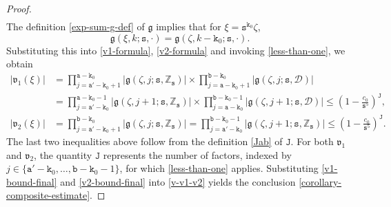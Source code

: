 \documentclass[12pt, twoside]{article}
\theoremstyle{definition}
\numberwithin{equation}{section}
\begin{document}
\begin{proof}
\begin{align}
\end{align} 
The definition \eqref{exp-sum-g-def} of $\mathfrak g$ implies that for $\xi = \mathtt s^{\mathtt k_0} \zeta$,
\begin{equation*}  \mathfrak g(\xi, k; \mathtt s, \cdot) = 
	\mathfrak g(\zeta, k - \mathtt k_0; \mathtt s, \cdot).
\end{equation*} 
Substituting this into \eqref{v1-formula}, \eqref{v2-formula} and invoking \eqref{less-than-one}, we obtain  
\begin{align} 
\bigl|\mathfrak v_1(\xi) \bigr| &= \prod_{j = \mathtt a' - \mathtt k_0 +1}^{\mathtt a - \mathtt k_0} \bigl|\mathfrak g(\zeta, j; \mathtt s, \mathbb Z_{\mathtt s}) \bigr| \times \prod_{j=\mathtt a - \mathtt k_0+1}^{\mathtt b - \mathtt k_0} \bigl|\mathfrak g(\zeta, j; \mathtt s, \mathscr{D})\bigr| \nonumber \\ 
&=  \prod_{j = \mathtt a' - \mathtt k_0}^{\mathtt a - \mathtt k_0-1} \bigl|\mathfrak g(\zeta, j+1; \mathtt s, \mathbb Z_{\mathtt s}) \bigr| \times \prod_{j=\mathtt a - \mathtt k_0}^{\mathtt b - \mathtt k_0-1} \bigl|\mathfrak g(\zeta, j+1; \mathtt s, \mathscr{D})\bigr| \leq \left(1 - \frac{c_0}{\mathtt s^5}\right)^{\mathtt J}, \label{v1-bound-final} \\ 
\bigl|\mathfrak v_2(\xi) \bigr| &= \prod_{j = \mathtt a' - \mathtt k_0+1}^{\mathtt b - \mathtt k_0} \bigl| \mathfrak g(\zeta, j; \mathtt s, \mathbb Z_{\mathtt s}) \bigr| = \prod_{j = \mathtt a' - \mathtt k_0}^{\mathtt b - \mathtt k_0-1} \bigl| \mathfrak g(\zeta, j+1; \mathtt s, \mathbb Z_{\mathtt s}) \bigr| \leq \left(1 - \frac{c_0}{\mathtt s^5}\right)^{\mathtt J}.  \label{v2-bound-final} 
\end{align} 
The last two inequalities above follow from the definition \eqref{Jab} of $\mathtt J$. For both $\mathfrak v_1$ and $\mathfrak v_2$, the quantity $\mathtt J$ represents the number of factors, indexed by $j \in \{\mathtt a'-\mathtt k_0, \ldots, \mathtt b - \mathtt k_0-1\}$, for which \eqref{less-than-one} applies.  Substituting \eqref{v1-bound-final} and \eqref{v2-bound-final} into \eqref{v-v1-v2} yields the conclusion \eqref{corollary-composite-estimate}. 
\end{proof} 
\end{document}
